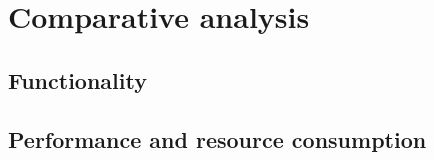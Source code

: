 
\chapter{Comparative analysis}
\label{ch:comparativeanalysis}

\section{Functionality}
\label{sec:comparativefunctionality}

\section{Performance and resource consumption}
\label{sec:comparativeperformance}

